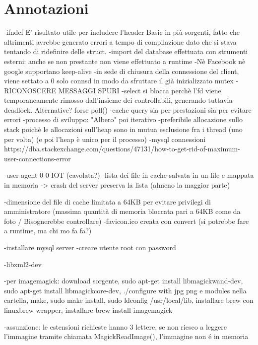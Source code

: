 \documentclass[a4paper, titlepage]{article}
\begin{document}
	\section{Annotazioni}
	\begin{flushleft}
		-ifndef E' risultato utile per includere l'header Basic in più sorgenti, fatto che altrimenti avrebbe generato errori a tempo di compilazione dato che si stava tentando di ridefinire delle struct.\newline
		-import del database effettuata con strumenti esterni: anche se non prestante non viene effettuato a runtime
		-Nè Facebook nè google supportano keep-alive
		-in sede di chiusura della connessione del client, viene settato a 0 solo connsd in modo da sfruttare il già inizializzato mutex
		-RICONOSCERE MESSAGGI SPURI
		-select si blocca perchè l'fd viene temporaneamente rimosso dall'insieme dei controllabili, generando tuttavia deadlock. Alternative? forse poll()
		-cache query sia per prestazioni sia per evitare errori
		-processo di sviluppo: "Albero" poi iterativo
		-preferibile allocazione sullo stack poichè le allocazioni sull'heap sono in mutua esclusione fra i thread (uno per volta) (e poi l'heap è unico per il processo)
		-mysql connessioni https://dba.stackexchange.com/questions/47131/how-to-get-rid-of-maximum-user-connections-error
		
		-user agent 0 0 IOT (cavolata?)
		-lista dei file in cache salvata in un file e mappata in memoria -> crash del server preserva la lista (almeno la maggior parte)
		
		-dimensione del file di cache limitata a 64KB per evitare privilegi di amministratore (massima quantità di memoria bloccata pari a 64KB come da foto / Bisognerebbe controllare)
		-favicon.ico creata con convert (si potrebbe fare a runtime, ma chi mo fa fa?)
		
		-installare mysql server
		-creare utente root con password
		
		-libxml2-dev
		
		-per imagemagick: download sorgente, sudo apt-get install libmagickwand-dev, sudo apt-get install libmagickcore-dev, ./configure with jpg png e modules nella cartella, make, sudo make install, sudo ldconfig /usr/local/lib, installare brew con linuxbrew-wrapper, installare brew install imagemagick


		-assunzione: le estensioni richieste hanno 3 lettere, se non riesco a leggere l'immagine tramite chiamata MagickReadImage(), l'immagine non é in memoria
	\end{flushleft}
	
\end{document}
